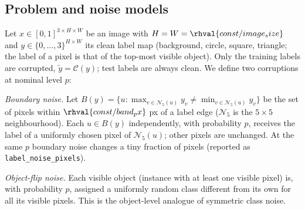 \subsection{Problem and noise models}
Let $x\in[0,1]^{3\times H\times W}$ be an image with $H=W=\rhval{const/image_size}$ and $y\in\{0,\dots,3\}^{H\times W}$ its clean label map (background, circle, square, triangle; the label of a pixel is that of the top-most visible object). Only the training labels are corrupted, $\tilde y=\mathcal{C}(y)$; test labels are always clean. We define two corruptions at nominal level $p$:

\emph{Boundary noise.} Let $B(y)=\{u: \max_{v\in\mathcal N_5(u)}y_v\neq\min_{v\in\mathcal N_5(u)}y_v\}$ be the set of pixels within $\rhval{const/band_px}$ px of a label edge ($\mathcal N_5$ is the $5\times5$ neighbourhood). Each $u\in B(y)$ independently, with probability $p$, receives the label of a uniformly chosen pixel of $\mathcal N_5(u)$; other pixels are unchanged. At the same $p$ boundary noise changes a tiny fraction of pixels (reported as \texttt{label\_noise\_pixels}).

\emph{Object-flip noise.} Each visible object (instance with at least one visible pixel) is, with probability $p$, assigned a uniformly random class different from its own for all its visible pixels. This is the object-level analogue of symmetric class noise.


